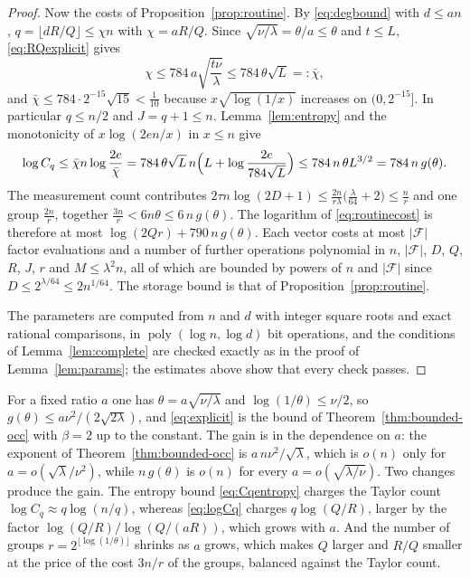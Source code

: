 \documentclass[11pt,reqno]{amsart}
\numberwithin{equation}{section}
\theoremstyle{plain}
\theoremstyle{definition}
\theoremstyle{remark}
\DeclareMathOperator{\poly}{poly}
\newcommand{\F}{\mathcal{F}}
\begin{document}
\begin{proof}
Now the costs of Proposition~\ref{prop:routine}. By \eqref{eq:degbound} with
$d\le an$, $q=\lfloor dR/Q\rfloor\le\chi n$ with $\chi=aR/Q$. Since
$\sqrt{\nu/\lambda}=\theta/a\le\theta$ and $t\le L$, \eqref{eq:RQexplicit} gives
\[
  \chi\le784\,a\sqrt{\frac{t\nu}{\lambda}}\le784\,\theta\sqrt L=:\bar\chi ,
\]
and $\bar\chi\le784\cdot2^{-15}\sqrt{15}<\frac1{10}$ because $x\sqrt{\log(1/x)}$
increases on $(0,2^{-15}]$. In particular $q\le n/2$ and $J=q+1\le n$.
Lemma~\ref{lem:entropy} and the monotonicity of $x\log(2en/x)$ in $x\le n$ give
\[
  \log C_q\le\bar\chi n\log\frac{2e}{\bar\chi}
  =784\,\theta\sqrt L\,n\Bigl(L+\log\frac{2e}{784\sqrt L}\Bigr)\le784\,n\,\theta L^{3/2}
  =784\,n\,g(\theta).
\]
The measurement count contributes
$2\tau n\log(2D+1)\le\frac{2n}{r\lambda}\bigl(\frac\lambda{64}+2\bigr)\le\frac nr$
and one group $\frac{2n}r$, together $\frac{3n}{r}<6n\theta\le6\,n\,g(\theta)$.
The logarithm of \eqref{eq:routinecost} is therefore at most
$\log(2Qr)+790\,n\,g(\theta)$. Each vector costs at most $|\F|$ factor evaluations
and a number of further operations polynomial in $n$, $|\F|$, $D$, $Q$, $R$, $J$,
$r$ and $M\le\lambda^2 n$, all of which are bounded by powers of $n$ and $|\F|$
since $D\le2^{\lambda/64}\le2n^{1/64}$. The storage bound is that of
Proposition~\ref{prop:routine}.

The parameters are computed from $n$ and $d$ with integer square roots and
exact rational comparisons, in $\poly(\log n,\log d)$ bit operations,
and the conditions of Lemma~\ref{lem:complete} are checked exactly as in the proof
of Lemma~\ref{lem:params}; the estimates above show that every check passes.
\end{proof}

For a fixed ratio $a$ one has $\theta=a\sqrt{\nu/\lambda}$ and $\log(1/\theta)\le\nu/2$,
so $g(\theta)\le a\nu^2/(2\sqrt{2\lambda})$, and \eqref{eq:explicit} is the bound of
Theorem~\ref{thm:bounded-occ} with $\beta=2$ up to the constant. The gain is in the
dependence on $a$: the exponent of Theorem~\ref{thm:bounded-occ} is
$a\,n\nu^2/\sqrt\lambda$, which is $o(n)$ only for $a=o(\sqrt\lambda/\nu^2)$, while
$n\,g(\theta)$ is $o(n)$ for every $a=o(\sqrt{\lambda/\nu})$. Two changes produce the
gain. The entropy bound \eqref{eq:Cqentropy} charges the Taylor count
$\log C_q\approx q\log(n/q)$, whereas \eqref{eq:logCq} charges $q\log(Q/R)$, larger by
the factor $\log(Q/R)/\log(Q/(aR))$, which grows with $a$. And the number of groups
$r=2^{\lfloor\log(1/\theta)\rfloor}$ shrinks as $a$ grows, which makes $Q$ larger and
$R/Q$ smaller at the price of the cost $3n/r$ of the groups, balanced against the
Taylor count.
\end{document}
